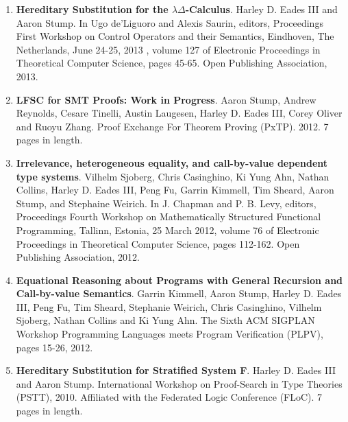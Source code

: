 \documentclass[11pt]{article}
\begin{document}
\begin{enumerate}
  \item[] \textbf{Hereditary Substitution for the
    $\lambda\Delta$-Calculus}.  Harley D. Eades III and Aaron Stump.
    In Ugo de'Liguoro and Alexis Saurin, editors, Proceedings First
    Workshop on Control Operators and their Semantics, Eindhoven, The
    Netherlands, June 24-25, 2013 , volume 127 of Electronic
    Proceedings in Theoretical Computer Science, pages 45-65. Open
    Publishing Association, 2013.

  \item[] \textbf{LFSC for SMT Proofs: Work in Progress}.  Aaron
    Stump, Andrew Reynolds, Cesare Tinelli, Austin Laugesen, Harley
    D. Eades III, Corey Oliver and Ruoyu Zhang.  Proof Exchange For
    Theorem Proving (PxTP). 2012. 7 pages in length.
    
  \item[] \textbf{Irrelevance, heterogeneous equality, and call-by-value
    dependent type systems}.  Vilhelm Sjoberg, Chris Casinghino, Ki
    Yung Ahn, Nathan Collins, Harley D. Eades III, Peng Fu, Garrin
    Kimmell, Tim Sheard, Aaron Stump, and Stephaine Weirich.  In
    J. Chapman and P. B. Levy, editors, Proceedings Fourth Workshop on
    Mathematically Structured Functional Programming, Tallinn,
    Estonia, 25 March 2012, volume 76 of Electronic Proceedings in
    Theoretical Computer Science, pages 112-162. Open Publishing
    Association, 2012.
    
  \item[] \textbf{Equational Reasoning about Programs with General
    Recursion and Call-by-value Semantics}.  Garrin Kimmell, Aaron
    Stump, Harley D. Eades III, Peng Fu, Tim Sheard, Stephanie
    Weirich, Chris Casinghino, Vilhelm Sjoberg, Nathan Collins and Ki
    Yung Ahn.  The Sixth ACM SIGPLAN Workshop Programming Languages
    meets Program Verification (PLPV), pages 15-26, 2012.
    
  \item[] \textbf{Hereditary Substitution for Stratified System
    F}. Harley D. Eades III and Aaron Stump.  International Workshop
    on Proof-Search in Type Theories (PSTT), 2010. Affiliated with the
    Federated Logic Conference (FLoC). 7 pages in length.    
  \end{enumerate}

      
\end{document}
